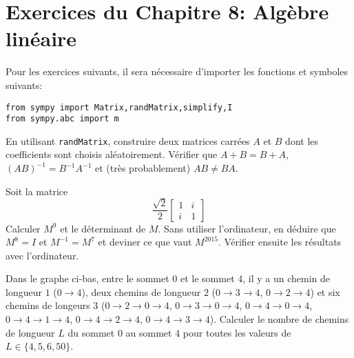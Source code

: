 
\section*{Exercices du Chapitre 8: Algèbre linéaire}

Pour les exercices suivants, il sera nécessaire d'importer les fonctions
et symboles suivants:
\begin{verbatim}
from sympy import Matrix,randMatrix,simplify,I
from sympy.abc import m
\end{verbatim}


\begin{exercice}
    En utilisant \texttt{randMatrix}, construire deux matrices carrées 
$A$ et $B$ dont les coefficients sont choisis aléatoirement. Vérifier que
$A+B=B+A$, $(AB)^{-1}=B^{-1}A^{-1}$ et (très probablement) $AB\neq BA$.
\end{exercice}

\begin{exercice}
Soit la matrice
\[
\frac{\sqrt{2}}{2}
\left[\begin{matrix}1 & i\\i & 1\end{matrix}\right]
\]
Calculer $M^9$ et le déterminant de $M$. Sans utiliser l'ordinateur, en déduire
que $M^8=I$ et $M^{-1}=M^7$ et deviner ce que vaut $M^{2015}$. Vérifier ensuite
les résultats avec l'ordinateur.
\end{exercice}


\begin{exercice}
    Dans le graphe ci-bas, entre le sommet $0$ et le sommet $4$, il y a 
    un chemin de longueur $1$ ($0\to4$),
    deux chemins de longueur $2$ ($0\to3\to4$, $0\to2\to4$) et 
    six chemins de longeurs $3$ 
    ($0\to2\to0\to4$, $0\to3\to0\to4$, $0\to4\to0\to4$, $0\to4\to1\to4$, 
    $0\to4\to2\to4$, $0\to4\to3\to4$).  
    Calculer le
    nombre de chemins de longueur $L$ du sommet $0$ au sommet $4$ pour toutes
    les valeurs de $L\in\{4,5,6,50\}$.
\begin{center}
\end{center}
\end{exercice}

